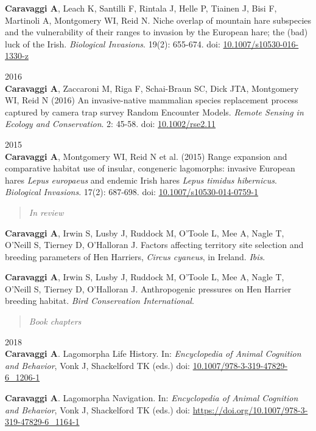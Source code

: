 \documentclass[]{article}
\begin{document}
\textbf{Caravaggi A}, Leach K, Santilli F, Rintala J, Helle P, Tiainen
J, Bisi F, Martinoli A, Montgomery WI, Reid N. Niche overlap of mountain
hare subspecies and the vulnerability of their ranges to invasion by the
European hare; the (bad) luck of the Irish. \emph{Biological Invasions}.
19(2): 655-674. doi:
\href{http://link.springer.com/article/10.1007/s10530-016-1330-z}{10.1007/s10530-016-1330-z}

2016\\
\textbf{Caravaggi A}, Zaccaroni M, Riga F, Schai-Braun SC, Dick JTA,
Montgomery WI, Reid N (2016) An invasive-native mammalian species
replacement process captured by camera trap survey Random Encounter
Models. \emph{Remote Sensing in Ecology and Conservation}. 2: 45-58.
doi:
\href{http://onlinelibrary.wiley.com/doi/10.1002/rse2.11/abstract}{10.1002/rse2.11}

2015\\
\textbf{Caravaggi A}, Montgomery WI, Reid N et al. (2015) Range
expansion and comparative habitat use of insular, congeneric lagomorphs:
invasive European hares \emph{Lepus europaeus} and endemic Irish hares
\emph{Lepus timidus hibernicus}. \emph{Biological Invasions}. 17(2):
687-698. doi:
\href{http://link.springer.com/article/10.1007/s10530-014-0759-1}{10.1007/s10530-014-0759-1}

\begin{quote}
\emph{In review}
\end{quote}

\textbf{Caravaggi A}, Irwin S, Lusby J, Ruddock M, O'Toole L, Mee A,
Nagle T, O'Neill S, Tierney D, O'Halloran J. Factors affecting territory
site selection and breeding parameters of Hen Harriers, \emph{Circus
cyaneus}, in Ireland. \emph{Ibis}.

\textbf{Caravaggi A}, Irwin S, Lusby J, Ruddock M, O'Toole L, Mee A,
Nagle T, O'Neill S, Tierney D, O'Halloran J. Anthropogenic pressures on
Hen Harrier breeding habitat. \emph{Bird Conservation International}.

\begin{quote}
\emph{Book chapters}
\end{quote}

2018\\
\textbf{Caravaggi A}. Lagomorpha Life History. In: \emph{Encyclopedia of
Animal Cognition and Behavior}, Vonk J, Shackelford TK (eds.) doi:
\href{https://link.springer.com/referenceworkentry/10.1007/978-3-319-47829-6_1206-1}{10.1007/978-3-319-47829-6\_1206-1}

\textbf{Caravaggi A}. Lagomorpha Navigation. In: \emph{Encyclopedia of
Animal Cognition and Behavior}, Vonk J, Shackelford TK (eds.) doi:
\href{https://link.springer.com/referenceworkentry/10.1007/978-3-319-47829-6_1164-1}{https://doi.org/10.1007/978-3-319-47829-6\_1164-1}
\end{document}
